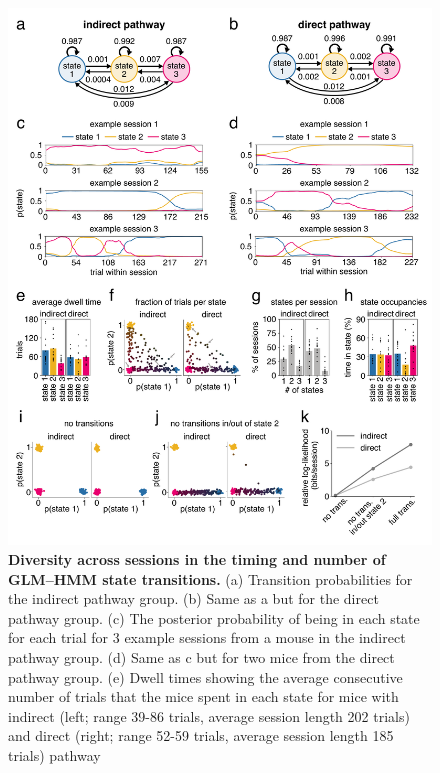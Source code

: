 \begin{figure}[t!]
  \begin{center}
    \includegraphics[width=0.90\linewidth]{ch2-glmhmm/glmhmm-figures/Fig7.pdf}
    \caption[Diversity across sessions in the timing and number of GLM–HMM state transitions]{\textbf{Diversity across sessions in the timing and number of GLM–HMM state transitions.} (a) Transition probabilities for the indirect pathway group. (b) Same as a but for the direct pathway group. (c) The posterior probability of being in each state for each trial for 3 example sessions from a mouse in the indirect pathway group. (d) Same as c but for two mice from the direct pathway group. (e) Dwell times showing the average consecutive number of trials that the mice spent in each state for mice with indirect (left; range 39-86 trials, average session length 202 trials) and direct (right; range 52-59 trials, average session length 185 trials) pathway}
    \label{fig:glmhmm:7}
  \end{center}
  \vspace{-1.5cm}
\end{figure}
